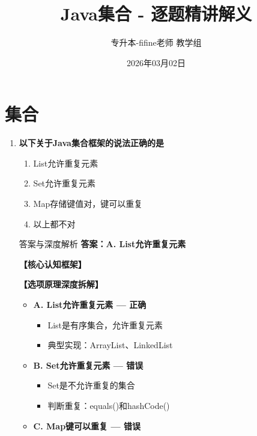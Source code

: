 \documentclass[12pt, a4paper]{ctexart}
\title{\textcolor{myblue}{\textbf{Java集合 - 逐题精讲解义}}}
\author{专升本-fifine老师 教学组}
\date{2026年03月02日}
\begin{document}
\maketitle
\thispagestyle{empty}
\newpage

\section{集合}

\begin{enumerate}[label=\textbf{\arabic*.}]

	\item \textbf{以下关于Java集合框架的说法正确的是}
	      \begin{enumerate}[label=\Alph*.]
		      \item List允许重复元素
		      \item Set允许重复元素
		      \item Map存储键值对，键可以重复
		      \item 以上都不对
	      \end{enumerate}

	      \begin{bluebox}{答案与深度解析}
		      \textbf{答案：A. List允许重复元素}

		      \textbf{【核心认知框架】}

		      \textbf{【选项原理深度拆解】}
					  \begin{itemize}[label={}, leftmargin=*, nosep]

		      
		      \item \textbf{A. List允许重复元素 — 正确}
					  \begin{itemize}[label={}, nosep]
		      
			      \item List是有序集合，允许重复元素
			      \item 典型实现：ArrayList、LinkedList
		      

					  \end{itemize}
		      \item \textbf{B. Set允许重复元素 — 错误}
					  \begin{itemize}[label={}, nosep]
		      
			      \item Set是不允许重复的集合
			      \item 判断重复：equals()和hashCode()
		      

					  \end{itemize}
		      \item \textbf{C. Map键可以重复 — 错误}
					  \begin{itemize}[label={}, nosep]
		      

\end{itemize}
\end{itemize}
\end{bluebox}
\end{enumerate}
\end{document}

